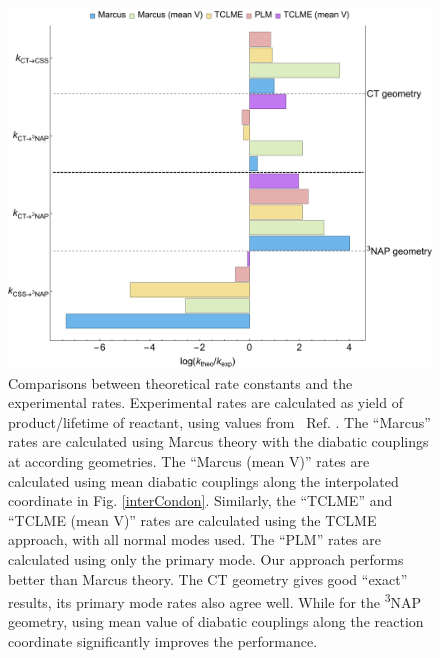 \begin{figure}[!ht]
\includegraphics[width=\columnwidth]{Chapters/chap4/Images/kTCLME-VS-EXPT.pdf}
\caption{Comparisons between theoretical rate constants and the experimental rates. Experimental rates are calculated as yield of product/lifetime of reactant, using values from ~Ref. \cite{delor2015mechanism}.  The ``Marcus'' rates are calculated using Marcus theory with the diabatic couplings at according geometries. The ``Marcus (mean V)'' rates are calculated using mean diabatic couplings along the interpolated coordinate in Fig. \ref{interCondon}. Similarly, the ``TCLME'' and ``TCLME (mean V)'' rates are calculated using the TCLME approach, with all normal modes used. The ``PLM'' rates are calculated using only the primary mode. Our approach performs better than Marcus theory. The CT geometry gives good ``exact'' results, its primary mode rates also agree well. While for the \textsuperscript{3}NAP geometry, using mean value of diabatic couplings along the reaction coordinate significantly improves the performance.\label{rateComp}}
\end{figure}



